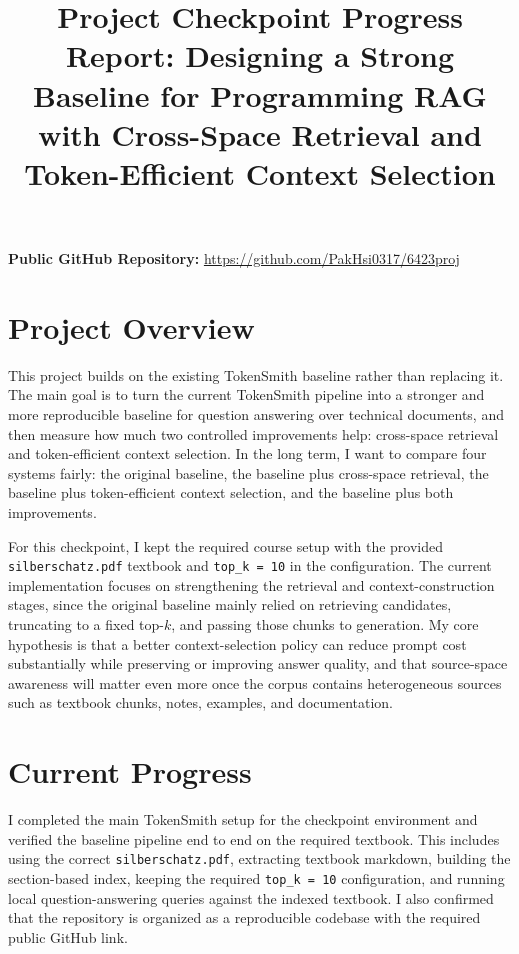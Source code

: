 \documentclass[10pt,twocolumn]{article}
\begin{document}
\title{\vspace{-1.2em}Project Checkpoint Progress Report: Designing a Strong Baseline for Programming RAG with Cross-Space Retrieval and Token-Efficient Context Selection\vspace{-0.8em}}
\author{}
\date{}
\maketitle
\thispagestyle{empty}

\textbf{Public GitHub Repository:} \url{https://github.com/PakHsi0317/6423proj}

\section*{Project Overview}
This project builds on the existing TokenSmith baseline rather than replacing it. The main goal is to turn the current TokenSmith pipeline into a stronger and more reproducible baseline for question answering over technical documents, and then measure how much two controlled improvements help: cross-space retrieval and token-efficient context selection. In the long term, I want to compare four systems fairly: the original baseline, the baseline plus cross-space retrieval, the baseline plus token-efficient context selection, and the baseline plus both improvements.

For this checkpoint, I kept the required course setup with the provided \texttt{silberschatz.pdf} textbook and \texttt{top\_k = 10} in the configuration. The current implementation focuses on strengthening the retrieval and context-construction stages, since the original baseline mainly relied on retrieving candidates, truncating to a fixed top-$k$, and passing those chunks to generation. My core hypothesis is that a better context-selection policy can reduce prompt cost substantially while preserving or improving answer quality, and that source-space awareness will matter even more once the corpus contains heterogeneous sources such as textbook chunks, notes, examples, and documentation.

\section*{Current Progress}
I completed the main TokenSmith setup for the checkpoint environment and verified the baseline pipeline end to end on the required textbook. This includes using the correct \texttt{silberschatz.pdf}, extracting textbook markdown, building the section-based index, keeping the required \texttt{top\_k = 10} configuration, and running local question-answering queries against the indexed textbook. I also confirmed that the repository is organized as a reproducible codebase with the required public GitHub link.
\end{document}
